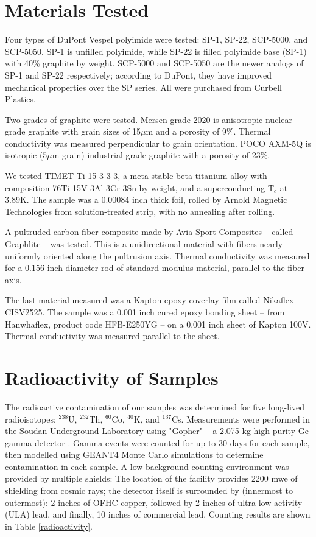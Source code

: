 \documentclass[final]{svjour2}
\begin{document}
\section{Materials Tested}
Four types of DuPont Vespel polyimide were tested: SP-1, SP-22, SCP-5000, and SCP-5050. SP-1 is unfilled polyimide, while SP-22 is filled polyimide base (SP-1) with 40\% graphite by weight. SCP-5000 and SCP-5050 are the newer analogs of SP-1 and SP-22 respectively; according to DuPont, they have improved mechanical properties over the SP series. All were purchased from Curbell Plastics.

Two grades of graphite were tested. Mersen grade 2020 is anisotropic nuclear grade graphite with grain sizes of 15$\mu$m and a porosity of 9\%. Thermal conductivity was measured perpendicular to grain orientation. POCO AXM-5Q is isotropic (5$\mu$m grain) industrial grade graphite with a porosity of 23\%.

We tested TIMET Ti 15-3-3-3, a meta-stable beta titanium alloy with composition 76Ti-15V-3Al-3Cr-3Sn by weight, and a superconducting T$_c$ at 3.89K\cite{Wikus2010}. The sample was a 0.00084 inch thick foil, rolled by Arnold Magnetic Technologies from solution-treated strip, with no annealing after rolling.

A pultruded carbon-fiber composite made by Avia Sport Composites -- called Graphlite -- was tested. This is a unidirectional material with fibers nearly uniformly oriented along the pultrusion axis. Thermal conductivity was measured for a 0.156 inch diameter rod of standard modulus material, parallel to the fiber axis.

The last material measured was a Kapton-epoxy coverlay film called Nikaflex CISV2525. The sample was a 0.001 inch cured epoxy bonding sheet -- from Hanwhaflex, product code HFB-E250YG -- on a 0.001 inch sheet of Kapton 100V.  Thermal conductivity was measured parallel to the sheet.

\section{Radioactivity of Samples}
The radioactive contamination of our samples was determined for five long-lived radioisotopes: $^{238}$U, $^{232}$Th, $^{60}$Co, $^{40}$K, and $^{137}$Cs. Measurements were performed in the Soudan Underground Laboratory using "Gopher" -- a 2.075 kg high-purity Ge gamma detector \footnotemark . Gamma events were counted for up to 30 days for each sample, then modelled using GEANT4 Monte Carlo simulations to determine contamination in each sample. A low background counting environment was provided by multiple shields: The location of the facility provides 2200 mwe of shielding from cosmic rays; the detector itself is surrounded by (innermost to outermost): 2 inches of OFHC copper, followed by 2 inches of ultra low activity (ULA) lead, and finally, 10 inches of commercial lead. Counting results are shown in Table \ref{radioactivity}.
\end{document}
